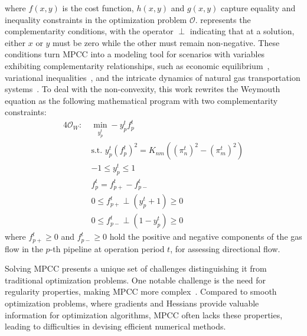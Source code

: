 where $f(x, y)$ is the cost function, $h(x,y)$ and $g(x,y)$ capture equality and inequality constraints in the optimization problem $\mathcal{O}$.  represents the complementarity conditions, with the operator $\perp$ indicating that at a solution, either $x$ or $y$ must be zero while the other must remain non-negative. These conditions turn MPCC into a modeling tool for scenarios with variables exhibiting complementarity relationships, such as economic equilibrium~\citep{MPCC_advantages}, variational inequalities~\citep{Hintermüller_Kopacka_2009}, and the intricate dynamics of natural gas transportation systems~\citep{Hante_Schmidt_2019}.
To deal with the non-convexity, this work rewrites the Weymouth equation as the following mathematical program with two complementarity constraints:
\begin{alignat}{4}
\label{eq:complementarity_relaxec3}
\mathcal{O}_W: \ &\min\limits_{y_p^t} -y_p^tf_{p}^t \\
& \text{s.t. } y_p^t(f_{p}^t)^2 = K_{nm}((\pi_{n}^t)^2-(\pi_{m}^t)^2)\nonumber\\
& -1 \leq y_p^t \leq 1 \nonumber\\
&f_{p}^t = f_{p+}^t - f_{p-}^t\nonumber\\
& 0 \leq f_{p+}^t \perp (y_p^t+1) \geq 0 \nonumber\\
& 0 \leq f_{p-}^t \perp (1-y_p^t) \geq 0 \nonumber
\end{alignat}
where $f_{p+}^t\geq0$ and $f_{p-}^t\geq0$ hold the positive and negative components of the gas flow in the $p$-th pipeline at operation period $t$, for assessing directional flow.


Solving MPCC presents a unique set of challenges distinguishing it from traditional optimization problems. One notable challenge is the need for regularity properties, making MPCC more complex~\citep{MPCC_lack_properties}. Compared to smooth optimization problems, where gradients and Hessians provide valuable information for optimization algorithms, MPCC often lacks these properties, leading to difficulties in devising efficient numerical methods.

